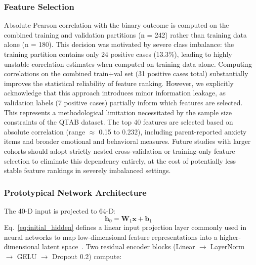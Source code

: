 \documentclass[10pt,letterpaper]{article}
\begin{document}
                                                                         \subsubsection*{\textbf{Feature Selection}}
                                                                         Absolute Pearson correlation with the binary outcome is computed on the combined training and validation partitions (n = 242) rather than training data alone (n = 180). This decision was motivated by severe class imbalance: the training partition contains only 24 positive cases (13.3\%), leading to highly unstable correlation estimates when computed on training data alone. Computing correlations on the combined train+val set (31 positive cases total) substantially improves the statistical reliability of feature ranking. However, we explicitly acknowledge that this approach introduces minor information leakage, as validation labels (7 positive cases) partially inform which features are selected. This represents a methodological limitation necessitated by the sample size constraints of the QTAB dataset. The top 40 features are selected based on absolute correlation (range $\approx$ 0.15 to 0.232), including parent-reported anxiety items and broader emotional and behavioral measures. Future studies with larger cohorts should adopt strictly nested cross-validation or training-only feature selection to eliminate this dependency entirely, at the cost of potentially less stable feature rankings in severely imbalanced settings.

                                                                         \subsubsection*{\textbf{Prototypical Network Architecture}}
                                                                         The 40-D input is projected to 64-D:
                                                                         \begin{equation} \label{eq_rob:3}
\mathbf{h}_0 = \mathbf{W}_1 \mathbf{x} + \mathbf{b}_1
\label{eq:initial_hidden}
\end{equation}
                                                                         Eq.~\eqref{eq:initial_hidden} defines a linear input projection layer commonly used in neural networks to map low-dimensional feature representations into a higher-dimensional latent space~\cite{ref49}. Two residual encoder blocks (Linear $\rightarrow$ LayerNorm $\rightarrow$ GELU $\rightarrow$ Dropout 0.2) compute:
\end{document}
